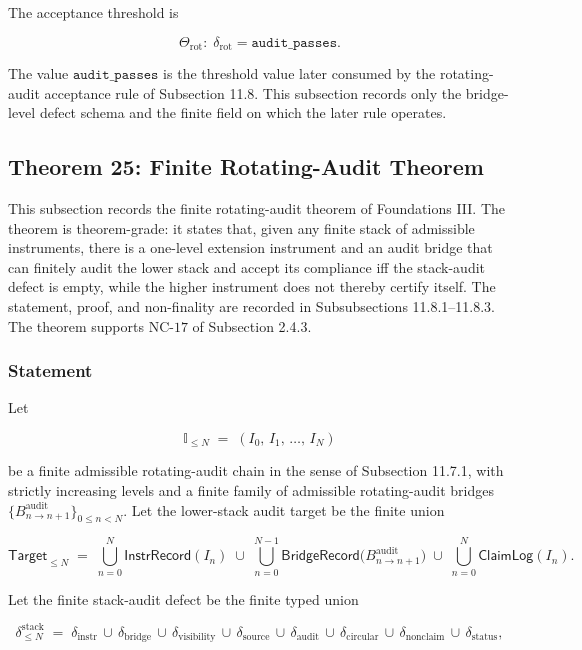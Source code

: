 \documentclass[11pt]{article}
\theoremstyle{definition}
\begin{document}
The acceptance threshold is

\[
\Theta_{\mathrm{rot}}:\;\delta_{\mathrm{rot}}=\texttt{audit\_passes}.
\]

The value \(\texttt{audit\_passes}\) is the threshold value later consumed by the rotating-audit acceptance rule of Subsection 11.8. This subsection records only the bridge-level defect schema and the finite field on which the later rule operates.

\subsection{Theorem 25: Finite Rotating-Audit Theorem}

This subsection records the finite rotating-audit theorem of Foundations III. The theorem is theorem-grade: it states that, given any finite stack of admissible instruments, there is a one-level extension instrument and an audit bridge that can finitely audit the lower stack and accept its compliance iff the stack-audit defect is empty, while the higher instrument does not thereby certify itself. The statement, proof, and non-finality are recorded in Subsubsections 11.8.1--11.8.3. The theorem supports \(\mathrm{NC}\text{-}17\) of Subsection 2.4.3.

\subsubsection{Statement}

Let

\[
\mathbb I_{\le N}\;=\;(I_0,\,I_1,\,\ldots,\,I_N)
\]

be a finite admissible rotating-audit chain in the sense of Subsection 11.7.1, with strictly increasing levels and a finite family of admissible rotating-audit bridges \(\{B^{\mathrm{audit}}_{n\to n+1}\}_{0\le n<N}\). Let the lower-stack audit target be the finite union

\[
\mathsf{Target}_{\le N}\;=\;\bigcup_{n=0}^{N}\mathsf{InstrRecord}(I_n)\;\cup\;\bigcup_{n=0}^{N-1}\mathsf{BridgeRecord}\bigl(B^{\mathrm{audit}}_{n\to n+1}\bigr)\;\cup\;\bigcup_{n=0}^{N}\mathsf{ClaimLog}(I_n).
\]

Let the finite stack-audit defect be the finite typed union

\[
\delta_{\le N}^{\mathrm{stack}}\;=\;\delta_{\mathrm{instr}}\,\cup\,\delta_{\mathrm{bridge}}\,\cup\,\delta_{\mathrm{visibility}}\,\cup\,\delta_{\mathrm{source}}\,\cup\,\delta_{\mathrm{audit}}\,\cup\,\delta_{\mathrm{circular}}\,\cup\,\delta_{\mathrm{nonclaim}}\,\cup\,\delta_{\mathrm{status}},
\]
\end{document}
